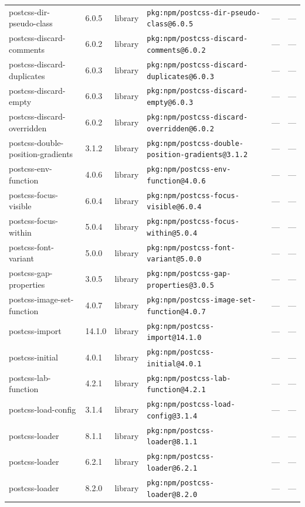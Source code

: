 \documentclass[11pt]{article}
\begin{document}
\begin{longtable}{|l|l|l|p{2.2cm}|l|p{4cm}|}
postcss-dir-pseudo-class & 6.0.5 & library & \texttt{pkg:npm/postcss-dir-pseudo-class@6.0.5} & — & — \\
postcss-discard-comments & 6.0.2 & library & \texttt{pkg:npm/postcss-discard-comments@6.0.2} & — & — \\
postcss-discard-duplicates & 6.0.3 & library & \texttt{pkg:npm/postcss-discard-duplicates@6.0.3} & — & — \\
postcss-discard-empty & 6.0.3 & library & \texttt{pkg:npm/postcss-discard-empty@6.0.3} & — & — \\
postcss-discard-overridden & 6.0.2 & library & \texttt{pkg:npm/postcss-discard-overridden@6.0.2} & — & — \\
postcss-double-position-gradients & 3.1.2 & library & \texttt{pkg:npm/postcss-double-position-gradients@3.1.2} & — & — \\
postcss-env-function & 4.0.6 & library & \texttt{pkg:npm/postcss-env-function@4.0.6} & — & — \\
postcss-focus-visible & 6.0.4 & library & \texttt{pkg:npm/postcss-focus-visible@6.0.4} & — & — \\
postcss-focus-within & 5.0.4 & library & \texttt{pkg:npm/postcss-focus-within@5.0.4} & — & — \\
postcss-font-variant & 5.0.0 & library & \texttt{pkg:npm/postcss-font-variant@5.0.0} & — & — \\
postcss-gap-properties & 3.0.5 & library & \texttt{pkg:npm/postcss-gap-properties@3.0.5} & — & — \\
postcss-image-set-function & 4.0.7 & library & \texttt{pkg:npm/postcss-image-set-function@4.0.7} & — & — \\
postcss-import & 14.1.0 & library & \texttt{pkg:npm/postcss-import@14.1.0} & — & — \\
postcss-initial & 4.0.1 & library & \texttt{pkg:npm/postcss-initial@4.0.1} & — & — \\
postcss-lab-function & 4.2.1 & library & \texttt{pkg:npm/postcss-lab-function@4.2.1} & — & — \\
postcss-load-config & 3.1.4 & library & \texttt{pkg:npm/postcss-load-config@3.1.4} & — & — \\
postcss-loader & 8.1.1 & library & \texttt{pkg:npm/postcss-loader@8.1.1} & — & — \\
postcss-loader & 6.2.1 & library & \texttt{pkg:npm/postcss-loader@6.2.1} & — & — \\
postcss-loader & 8.2.0 & library & \texttt{pkg:npm/postcss-loader@8.2.0} & — & — \\

\end{longtable}
\end{document}

